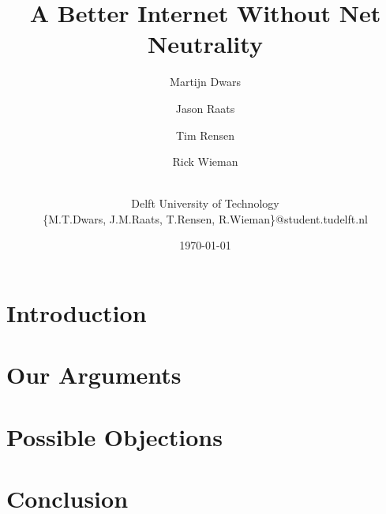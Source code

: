 \documentclass[11pt]{article}
\title{A Better Internet Without Net Neutrality}
\author{Martijn Dwars\and
    Jason Raats\and
    Tim Rensen\and
    Rick Wieman\and
\\Delft University of Technology
\\\{M.T.Dwars, J.M.Raats, T.Rensen, R.Wieman\}@student.tudelft.nl
}
\date{\today}
\begin{document}
\maketitle
\thispagestyle{empty}

\section{Introduction}
\label{sec:intro}


\section{Our Arguments}
\label{sec:arguments}


\section{Possible Objections}
\label{sec:objections}


\section{Conclusion}
\label{sec:conclusion}




\end{document}
